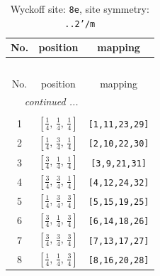 \documentclass[fleqn,8pt]{jsarticle}
\begin{document}
\renewcommand{\arraystretch}{1.2}
\begin{longtable}{ccc}
\caption{Wyckoff site: {\tt 8e}, site symmetry: {\tt ..2'/m}}
 \\
 \hline \hline
No. & position & mapping \\ \hline \endfirsthead

\multicolumn{2}{l}{\tablename\ \thetable{}} \\
 \hline \hline
No. & position & mapping \\ \hline \endhead

 \hline \hline
\multicolumn{2}{r}{\footnotesize\it continued ...} \\ \endfoot

 \hline \hline
\multicolumn{2}{r}{} \\ \endlastfoot

1 & $\left[ \frac{1}{4},\, \frac{1}{4},\, \frac{1}{4} \right]$ & {\tt [1,11,23,29]} \\ \hline
2 & $\left[ \frac{1}{4},\, \frac{3}{4},\, \frac{1}{4} \right]$ & {\tt [2,10,22,30]} \\ \hline
3 & $\left[ \frac{3}{4},\, \frac{1}{4},\, \frac{1}{4} \right]$ & {\tt [3,9,21,31]} \\ \hline
4 & $\left[ \frac{3}{4},\, \frac{3}{4},\, \frac{1}{4} \right]$ & {\tt [4,12,24,32]} \\ \hline
5 & $\left[ \frac{1}{4},\, \frac{3}{4},\, \frac{3}{4} \right]$ & {\tt [5,15,19,25]} \\ \hline
6 & $\left[ \frac{3}{4},\, \frac{1}{4},\, \frac{3}{4} \right]$ & {\tt [6,14,18,26]} \\ \hline
7 & $\left[ \frac{3}{4},\, \frac{3}{4},\, \frac{3}{4} \right]$ & {\tt [7,13,17,27]} \\ \hline
8 & $\left[ \frac{1}{4},\, \frac{1}{4},\, \frac{3}{4} \right]$ & {\tt [8,16,20,28]} \\
\end{longtable}
\renewcommand{\arraystretch}{1.2}
\end{document}
